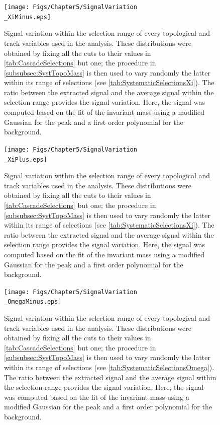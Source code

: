 \begin{landscape}
\begin{figure}[h]
	\centering
	\texttt{[image: Figs/Chapter5/SignalVariation\\\_XiMinus.eps]}
\caption{Signal variation within the selection range of every topological and track variables used in the \rmXiM analysis. These distributions were obtained by fixing all the cuts to their values in \tab\ref{tab:CascadeSelections} but one;  the procedure in \Sec\ref{subsubsec:SystTopoMass} is then used to vary randomly the latter within its range of selections (see \tab\ref{tab:SystematicSelectionsXi}). The ratio between the extracted signal and the average signal within the selection range provides the signal variation. Here, the signal was computed based on the fit of the invariant mass using a modified Gaussian for the peak and a first order polynomial for the background.}
	\label{fig:SignalVariation_TopoSel_XiMinus}
\end{figure}

\begin{figure}[h]
	\centering
	\texttt{[image: Figs/Chapter5/SignalVariation\\\_XiPlus.eps]}
\caption{Signal variation within the selection range of every topological and track variables used in the \rmAxiP analysis. These distributions were obtained by fixing all the cuts to their values in \tab\ref{tab:CascadeSelections} but one; the procedure in \Sec\ref{subsubsec:SystTopoMass} is then used to vary randomly the latter within its range of selections (see \tab\ref{tab:SystematicSelectionsXi}). The ratio between the extracted signal and the average signal within the selection range provides the signal variation. Here, the signal was computed based on the fit of the invariant mass using a modified Gaussian for the peak and a first order polynomial for the background.}
	\label{fig:SignalVariation_TopoSel_XiPlus}
\end{figure}

\begin{figure}[h]
	\centering
	\texttt{[image: Figs/Chapter5/SignalVariation\\\_OmegaMinus.eps]}
\caption{Signal variation within the selection range of every topological and track variables used in the \rmOmegaM analysis. These distributions were obtained by fixing all the cuts to their values in \tab\ref{tab:CascadeSelections} but one; the procedure in \Sec\ref{subsubsec:SystTopoMass} is then used to vary randomly the latter within its range of selections (see \tab\ref{tab:SystematicSelectionsOmega}). The ratio between the extracted signal and the average signal within the selection range provides the signal variation. Here, the signal was computed based on the fit of the invariant mass using a modified Gaussian for the peak and a first order polynomial for the background.}
	\label{fig:SignalVariation_TopoSel_OmegaMinus}
\end{figure}


\end{landscape}
